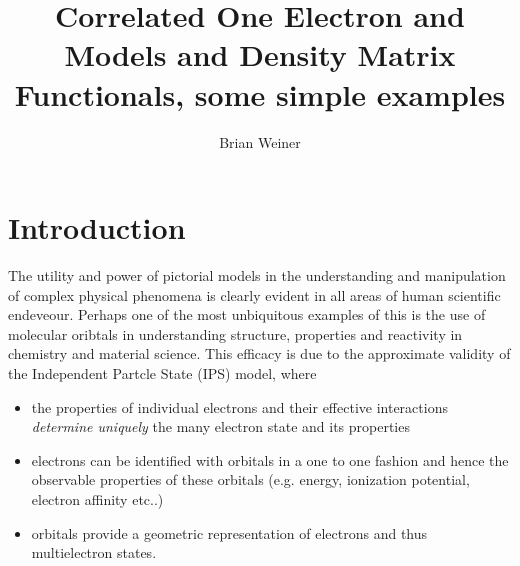 \documentclass[aps,preprint]{revtex4}%
\begin{document}
\preprint{ }
\title[One Electron Models]{Correlated One Electron and Models and Density Matrix Functionals, some simple
examples }
\author{Brian Weiner}

\begin{abstract}


\end{abstract}
\maketitle
\tableofcontents


\section{Introduction\label{Intro}}

The utility and power of pictorial models in the understanding and
manipulation of complex physical phenomena is clearly evident in all areas of
human scientific endeveour. Perhaps one of the most unbiquitous examples of
this is the use of molecular oribtals in understanding structure, properties
and reactivity in chemistry and material science. This efficacy is due to the
approximate validity of the Independent Partcle State (IPS) model, where  

\begin{itemize}
\item the properties of individual electrons and their effective interactions
\emph{determine uniquely} the many electron state and its properties

\item electrons can be identified with orbitals in a one to one fashion and
hence the observable properties of these orbitals (e.g. energy, ionization
potential, electron affinity etc..) 

\item orbitals provide a geometric representation of electrons and thus
multielectron states.   
\end{itemize}
\end{document}
